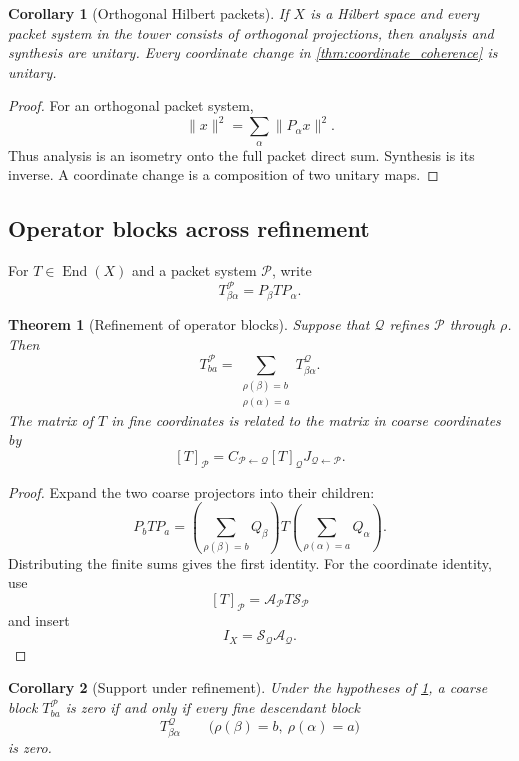 \documentclass{aomart}
\newtheorem{theorem}{Theorem}[section]
\newtheorem{corollary}[corollary]{Corollary}
\theoremstyle{definition}
\theoremstyle{remark}
\newcommand{\Acal}{\mathcal A}
\newcommand{\Pcal}{\mathcal P}
\newcommand{\Qcal}{\mathcal Q}
\newcommand{\Scal}{\mathcal S}
\newcommand{\End}{\operatorname{End}}
\begin{document}
\begin{corollary}[Orthogonal Hilbert packets]\label{cor:orthogonal_isometry}
If $X$ is a Hilbert space and every packet system in the tower consists of orthogonal projections, then analysis and synthesis are unitary.  Every coordinate change in \cref{thm:coordinate_coherence} is unitary.
\end{corollary}

\begin{proof}
For an orthogonal packet system,
\[
\|x\|^2=\sum_\alpha\|P_\alpha x\|^2.
\]
Thus analysis is an isometry onto the full packet direct sum.  Synthesis is its inverse.  A coordinate change is a composition of two unitary maps.
\end{proof}

\subsection{Operator blocks across refinement}

For $T\in\End(X)$ and a packet system $\Pcal$, write
\[
T^{\Pcal}_{\beta\alpha}=P_\beta T P_\alpha.
\]

\begin{theorem}[Refinement of operator blocks]\label{thm:block_refinement}
Suppose that $\Qcal$ refines $\Pcal$ through $\rho$.  Then
\[
T^{\Pcal}_{ba}
=
\sum_{\substack{\rho(\beta)=b\\\rho(\alpha)=a}}
T^{\Qcal}_{\beta\alpha}.
\]
The matrix of $T$ in fine coordinates is related to the matrix in coarse coordinates by
\[
[T]_{\Pcal}
=
C_{\Pcal\leftarrow\Qcal}[T]_{\Qcal}J_{\Qcal\leftarrow\Pcal}.
\]
\end{theorem}

\begin{proof}
Expand the two coarse projectors into their children:
\[
P_bTP_a
=
\left(\sum_{\rho(\beta)=b}Q_\beta\right)
T
\left(\sum_{\rho(\alpha)=a}Q_\alpha\right).
\]
Distributing the finite sums gives the first identity.  For the coordinate identity, use
\[
[T]_{\Pcal}=\Acal_{\Pcal}T\Scal_{\Pcal}
\]
and insert
\[
I_X=\Scal_{\Qcal}\Acal_{\Qcal}.
\]
\end{proof}

\begin{corollary}[Support under refinement]\label{cor:block_support_refinement}
Under the hypotheses of \cref{thm:block_refinement}, a coarse block $T^{\Pcal}_{ba}$ is zero if and only if every fine descendant block
\[
T^{\Qcal}_{\beta\alpha}
\qquad
\bigl(\rho(\beta)=b,\ \rho(\alpha)=a\bigr)
\]
is zero.
\end{corollary}
\end{document}
